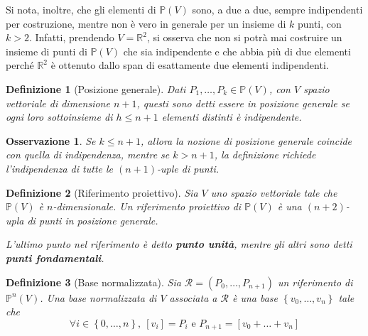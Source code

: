 \documentclass[11pt]{scrartcl}
\theoremstyle{style1}
\newtheorem{osservazione}{Osservazione}[section]
\newtheorem{definizione}{Definizione}[section]
\numberwithin{equation}{subsection}
\begin{document}
Si nota, inoltre, che gli elementi di $\mathbb{P}(V)$ sono, a due a due, sempre indipendenti per costruzione, mentre non \`e vero in generale per un insieme di $k$ punti, con $k>2$.
Infatti, prendendo $V = \mathbb{R}^2$, si osserva che non si potr\`a mai costruire un insieme di punti di $\mathbb{P}(V)$ che sia indipendente e che abbia pi\`u di due elementi perch\'e $\mathbb{R}^2$ \`e ottenuto dallo span di esattamente due elementi indipendenti.
\begin{definizione}
	[Posizione generale]
	Dati $P_1,\ldots,P_k \in \mathbb{P}(V)$, con $V$ spazio vettoriale di dimensione $n+1$, questi sono detti essere in \textit{posizione generale} se ogni loro sottoinsieme di $h\le n+1$ elementi distinti \`e indipendente.
\end{definizione}
\begin{osservazione}
Se $k\le n+1$, allora la nozione di posizione generale coincide con quella di indipendenza, mentre se $k>n+1$, la definizione richiede l'indipendenza di tutte le $(n+1)$-uple di punti.
\end{osservazione}
\begin{definizione}
	[Riferimento proiettivo]
	Sia $V$ uno spazio vettoriale tale che $\mathbb{P}(V)$ \`e $n$-dimensionale.
	Un \textit{riferimento proiettivo} di $\mathbb{P}(V)$ \`e una $(n+2)$-upla di punti in posizione generale.

	L'ultimo punto nel riferimento \`e detto \textbf{punto unit\`a}, mentre gli altri sono detti \textbf{punti fondamentali}.
\end{definizione}
\begin{definizione}
	[Base normalizzata]
	Sia $\mathcal{R} =(P_0,\ldots,P_{n+1} )$ un riferimento di $\mathbb{P}^n(V)$.
	Una \textit{base normalizzata} di $V$ associata a $\mathcal{R} $ \`e una base $\left\{ v_0,\ldots,v_n \right\} $ tale che
	\[
		\forall i \in \left\{ 0,\ldots,n \right\} , \ [v_i] = P_i \text{ e } P_{n+1} = [v_0+\ldots+v_n]
	\] 
\end{definizione}
\end{document}
